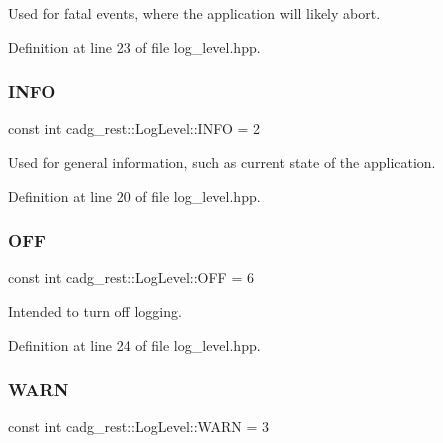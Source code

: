 Used for fatal events, where the application will likely abort. 



Definition at line 23 of file log\+\_\+level.\+hpp.

\mbox{\label{structcadg__rest_1_1_log_level_a126732fe6956d50f96c61ca298e835db}} 
\subsubsection{\texorpdfstring{INFO}{INFO}}
{\footnotesize\ttfamily const int cadg\+\_\+rest\+::\+Log\+Level\+::\+I\+N\+FO = 2\hspace{0.3cm}{\ttfamily [static]}}



Used for general information, such as current state of the application. 



Definition at line 20 of file log\+\_\+level.\+hpp.

\mbox{\label{structcadg__rest_1_1_log_level_a9b50615df04a7600bf4f87cb06952f3d}} 
\subsubsection{\texorpdfstring{OFF}{OFF}}
{\footnotesize\ttfamily const int cadg\+\_\+rest\+::\+Log\+Level\+::\+O\+FF = 6\hspace{0.3cm}{\ttfamily [static]}}



Intended to turn off logging. 



Definition at line 24 of file log\+\_\+level.\+hpp.

\mbox{\label{structcadg__rest_1_1_log_level_a3a2ce9f6e0bc59cd275bd85542930e94}} 
\subsubsection{\texorpdfstring{WARN}{WARN}}
{\footnotesize\ttfamily const int cadg\+\_\+rest\+::\+Log\+Level\+::\+W\+A\+RN = 3\hspace{0.3cm}{\ttfamily [static]}}



